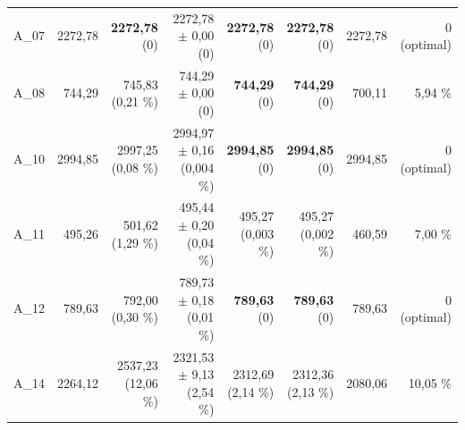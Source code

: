 \begin{tabular}{lrrrrrrr}
A\_07 & 2272,78 & \makecell{\textbf{2272,78}\\ \footnotesize(0)} & \makecell{2272,78 $\pm$ 0,00\\ \footnotesize(0)} & \makecell{\textbf{2272,78}\\ \footnotesize(0)} & \makecell{\textbf{2272,78}\\ \footnotesize(0)} & 2272,78 & 0 (optimal) \\
A\_08 & 744,29 & \makecell{745,83\\ \footnotesize(0,21 \%)} & \makecell{744,29 $\pm$ 0,00\\ \footnotesize(0)} & \makecell{\textbf{744,29}\\ \footnotesize(0)} & \makecell{\textbf{744,29}\\ \footnotesize(0)} & 700,11 & 5,94 \% \\
A\_10 & 2994,85 & \makecell{2997,25\\ \footnotesize(0,08 \%)} & \makecell{2994,97 $\pm$ 0,16\\ \footnotesize(0,004 \%)} & \makecell{\textbf{2994,85}\\ \footnotesize(0)} & \makecell{\textbf{2994,85}\\ \footnotesize(0)} & 2994,85 & 0 (optimal) \\
A\_11 & 495,26 & \makecell{501,62\\ \footnotesize(1,29 \%)} & \makecell{495,44 $\pm$ 0,20\\ \footnotesize(0,04 \%)} & \makecell{495,27\\ \footnotesize(0,003 \%)} & \makecell{495,27\\ \footnotesize(0,002 \%)} & 460,59 & 7,00 \% \\
A\_12 & 789,63 & \makecell{792,00\\ \footnotesize(0,30 \%)} & \makecell{789,73 $\pm$ 0,18\\ \footnotesize(0,01 \%)} & \makecell{\textbf{789,63}\\ \footnotesize(0)} & \makecell{\textbf{789,63}\\ \footnotesize(0)} & 789,63 & 0 (optimal) \\
A\_14 & 2264,12 & \makecell{2537,23\\ \footnotesize(12,06 \%)} & \makecell{2321,53 $\pm$ 9,13\\ \footnotesize(2,54 \%)} & \makecell{2312,69\\ \footnotesize(2,14 \%)} & \makecell{2312,36\\ \footnotesize(2,13 \%)} & 2080,06 & 10,05 \% \\

\end{tabular}
